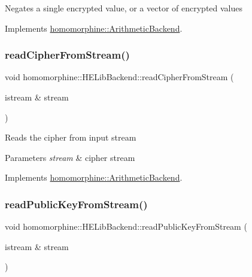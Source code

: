 Negates a single encrypted value, or a vector of encrypted values 

Implements \hyperlink{classhomomorphine_1_1_arithmetic_backend_ad27913060534c42b5812a1e4cf21475f}{homomorphine\+::\+Arithmetic\+Backend}.

\mbox{\label{classhomomorphine_1_1_h_e_lib_backend_a91b1a5b9baa1031addb9fce1e4a05ec0}} 
\subsubsection{\texorpdfstring{read\+Cipher\+From\+Stream()}{readCipherFromStream()}}
{\footnotesize\ttfamily void homomorphine\+::\+H\+E\+Lib\+Backend\+::read\+Cipher\+From\+Stream (\begin{DoxyParamCaption}\item[{istream \&}]{stream }\end{DoxyParamCaption})\hspace{0.3cm}{\ttfamily [virtual]}}

Reads the cipher from input stream


\begin{DoxyParams}{Parameters}
{\em stream} & cipher stream \\
\hline
\end{DoxyParams}


Implements \hyperlink{classhomomorphine_1_1_arithmetic_backend_ac8fe4568424c616b653a955b172c480b}{homomorphine\+::\+Arithmetic\+Backend}.

\mbox{\label{classhomomorphine_1_1_h_e_lib_backend_a2b9f132cc4dde870db1e69553349813b}} 
\subsubsection{\texorpdfstring{read\+Public\+Key\+From\+Stream()}{readPublicKeyFromStream()}}
{\footnotesize\ttfamily void homomorphine\+::\+H\+E\+Lib\+Backend\+::read\+Public\+Key\+From\+Stream (\begin{DoxyParamCaption}\item[{istream \&}]{stream }\end{DoxyParamCaption})\hspace{0.3cm}{\ttfamily [virtual]}}

